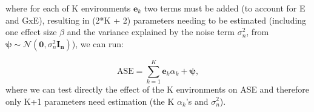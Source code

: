 \begin{Comment}
where for each of K environments $\mathbf{e}_k$ two terms must be added (to account for E and GxE), resulting in (2*K + 2) parameters needing to be estimated (including one effect size $\beta$ and the variance explained by the noise term $\sigma_n^2$, from $\boldsymbol{\psi} \sim \mathcal{N}(\mathbf{0}, \sigma_n^2\mathbf{I_n})$), we can run:

\begin{equation*}
    \mathrm{ASE} = \sum_{k=1}^{K} \mathbf{e}_k\alpha_k + \boldsymbol{\psi}, 
\end{equation*}
where we can test directly the effect of the K environments on ASE and therefore only K+1 parameters need estimation (the K $\alpha_k$'s and $\sigma_n^2$).

\end{Comment}




